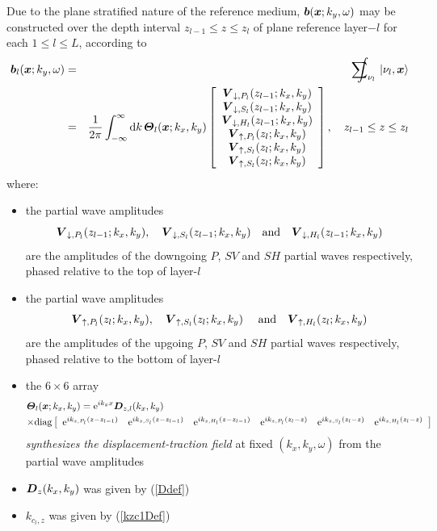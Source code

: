 Due to the plane stratified nature of the reference medium, ${\mbox{\boldmath$\mit b$\unboldmath}}({\mbox{\boldmath$\mit x$\unboldmath}};k_y,\omega)$ may be constructed over the depth interval $z_{l-1} \le z \le 
z_{l}$  of plane reference layer$-l$ for each $1 \le l \le L$,  according to
\begin{eqnarray} \label{brepj}
{\bmi b}_{l}({\bmi x};k_y,\omega)&=& \sum\nolimits_{\nu_{l}}\!\!\!\!\!\!\!\!\!\!\! 
\int \,\,\,\,\, \left|\nu_{l}, {\bmi x}  
\right\rangle\\
&=& \frac{1}{2 \pi} \int_{-\infty}^{\infty} {\rm d}k \, 
{\bmi \Theta}_{l}({\bmi x};k_{x},k_{y})
\left[\begin{array}{c}
{\bmi V}_{\downarrow 
,P_{l} }({z}_{l-1};k_{x},k_{y})\\
{\bmi V}_{\downarrow ,S_{l} }({z}_{l-1};k_{x},k_{y})\\
{\bmi V}_{\downarrow ,H_{l} }({z}_{l-1};k_{x},k_{y})\\
{\bmi V}_{\uparrow , P_{l} }({z}_{l};k_{x},k_{y})\\
{\bmi V}_{\uparrow , S_{l} }({z}_{l};k_{x},k_{y})\\
{\bmi V}_{\uparrow , S_{l} }({z}_{l};k_{x},k_{y})
\end{array}\right], \quad z_{l-1}\le z \le z_{l}\nonumber
\end{eqnarray}
where:
\begin{itemize}
\item the partial wave amplitudes 
\[{\mbox{\boldmath$\mit V$\unboldmath}}_{\downarrow ,P_{l} 
}({z}_{l-1}; k_{x},k_{y}),\quad 
{\mbox{\boldmath$\mit V$\unboldmath}}_{\downarrow ,S_{l} }({z}_{l-1};k_{x},k_{y})\quad \mbox{and}
\quad{\mbox{\boldmath$\mit V$\unboldmath}}_{\downarrow ,H_{l} }({z}_{l-1};k_{x},k_{y})
\]
 are the amplitudes 
of the downgoing  $P$, $SV$ and $SH$  partial waves  respectively, phased relative to 
the top of layer-$l$
\item the partial wave amplitudes 
\[{\mbox{\boldmath$\mit V$\unboldmath}}_{\uparrow ,P_{l} }({z}_{l};k_{x},k_{y}),\quad
{\mbox{\boldmath$\mit V$\unboldmath}}_{\uparrow ,S_{l} }({z}_{l};k_{x},k_{y})\quad \mbox{ and} 
\quad{\mbox{\boldmath$\mit V$\unboldmath}}_{\uparrow ,H_{l} }({z}_{l};k_{x},k_{y})
\]
 are the amplitudes of the upgoing $P$, $SV$ and $SH$ partial waves  respectively, phased relative to 
the bottom of layer-$l$
\item the $6 \times 6$ array
\begin{eqnarray} \label{Thetaldef}
\lefteqn{{\bmi \Theta}_{l}({\bmi x};k_{x},k_{y})=
{\rm e}^{i{ k}_{x} x} {\bmi D}_{z,l}(k_{x},k_{y})}\\
&&\!\!\!\!\!\!
\times
\mbox{diag}\left[\begin{array}{cccccc}
{\rm e}^{i{ k}_{z,P_l} (z-z_{l-1})}&
{\rm e}^{i{ k}_{z,S_l} (z-z_{l-1})}
&{\rm e}^{i{ k}_{z,H_l} (z-z_{l-1})}
&{\rm e}^{i{ k}_{z,P_l} (z_{l}-z)}
&{\rm e}^{i{ k}_{z,S_l} (z_{l}-z)}&
{\rm e}^{i{ k}_{z,H_l} (z_{l}-z)}
\end{array}\right]\nonumber
\end{eqnarray} 
{\em synthesizes the  displacement-traction field\/} at fixed $(k_x,k_y, 
\omega)$ from the partial wave amplitudes

\item  ${\mbox{\boldmath$\mit D$\unboldmath}}_{z}(k_{x},k_{y})$  was given by (\ref{Ddef})
\item ${ k}_{c_l,z}$ was given by (\ref{kzc1Def})
\end{itemize}

